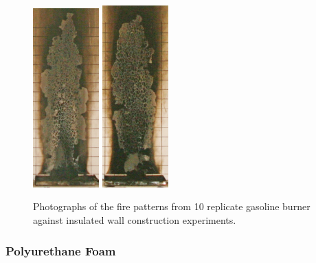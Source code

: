 \documentclass[twoside]{uocthesis}
\begin{document}
{\begin{figure}[p]
	\includegraphics[width=1.0in]{../Figures/GBGAS_21_IMG_6006}
	\includegraphics[width=1.0in]{../Figures/GBGAS_22_IMG_6026}	\\

	\caption[Photographs of the fire patterns from 10 replicate gasoline burner against insulated wall construction experiments.]{Photographs of the fire patterns from 10 replicate gasoline burner against insulated wall construction experiments.}
	\label{Gas_Insulated_Wall}
\end{figure}

\subsubsection{Polyurethane Foam}

}
\end{document}

